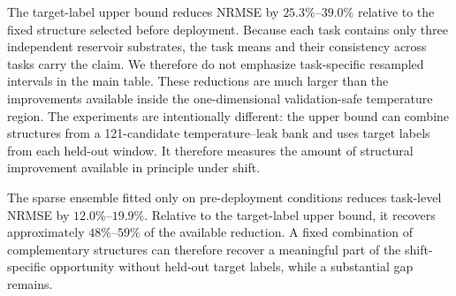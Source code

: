 \documentclass[preprint,12pt,authoryear]{elsarticle}
\begin{document}
\begin{table}[H]
\centering
\caption{Distribution-shift results by task. NRMSE values are averaged over held-out shift types and three independent reservoir substrates. Relative gains use $(L_{\mathrm{fixed}}-L_{\mathrm{policy}})/L_{\mathrm{fixed}}$. Because only three substrates are available per task, the main table reports the observed task means rather than emphasizing resampled task-specific confidence intervals.}
\label{tab:shift_task_results}
\small
\setlength{\tabcolsep}{4.5pt}
\end{table}

The target-label upper bound reduces NRMSE by $25.3\%$--$39.0\%$ relative to the fixed structure selected before deployment. Because each task contains only three independent reservoir substrates, the task means and their consistency across tasks carry the claim. We therefore do not emphasize task-specific resampled intervals in the main table. These reductions are much larger than the improvements available inside the one-dimensional validation-safe temperature region. The experiments are intentionally different: the upper bound can combine structures from a 121-candidate temperature--leak bank and uses target labels from each held-out window. It therefore measures the amount of structural improvement available in principle under shift.

The sparse ensemble fitted only on pre-deployment conditions reduces task-level NRMSE by $12.0\%$--$19.9\%$. Relative to the target-label upper bound, it recovers approximately $48\%$--$59\%$ of the available reduction. A fixed combination of complementary structures can therefore recover a meaningful part of the shift-specific opportunity without held-out target labels, while a substantial gap remains.
\end{document}
